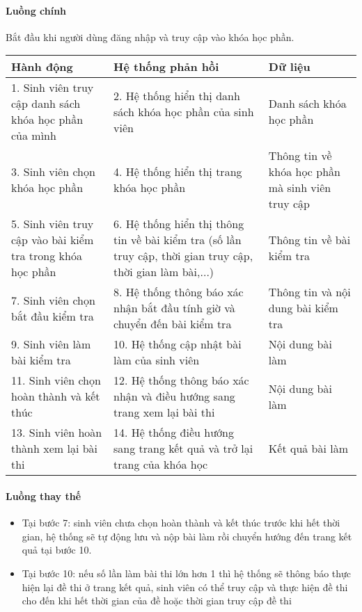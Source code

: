 \documentclass[./../main_file.tex]{subfiles}
\begin{document}
\paragraph{Luồng chính}
Bắt đầu khi người dùng đăng nhập và truy cập vào khóa học phần.
\begin{table}[H]
				\begin{tabular}{|p{.33\textwidth}|p{}|p{}|}
		\hline
		\textbf{Hành động} &
		\textbf{Hệ thống phản hồi} &
		\textbf{Dữ liệu} \\ \hline
		1. Sinh viên truy cập danh sách khóa học phần của mình &
		2. Hệ thống hiển thị danh sách khóa học phần của sinh viên &
		Danh sách khóa học phần \\ \hline
		3. Sinh viên chọn khóa học phần &
		4.  Hệ thống hiển thị trang khóa học phần &
		Thông tin về khóa học phần mà sinh viên truy cập \\ \hline
		5. Sinh viên truy cập vào bài kiểm tra trong khóa học phần &
		6. Hệ thống hiển thị thông tin về bài kiểm tra (số lần truy cập, thời gian truy cập, thời gian làm bài,...) &
		Thông tin về bài kiểm tra \\ \hline
		7. Sinh viên chọn bắt đầu kiểm tra &
		8. Hệ thống thông báo xác nhận bắt đầu tính giờ và chuyển đến bài kiểm tra &
		Thông tin và nội dung bài kiểm tra \\ \hline
		9. Sinh viên làm bài kiểm tra &
		10. Hệ thống cập nhật bài làm của sinh viên &
		Nội dung bài làm \\ \hline
		11. Sinh viên chọn hoàn thành và kết thúc &
		12. Hệ thống thông báo xác nhận và điều hướng sang trang xem lại bài thi &
		Nội dung bài làm \\ \hline
		13. Sinh viên hoàn thành xem lại bài thi &
		14. Hệ thống điều hướng sang trang kết quả và trở lại trang của khóa học &
		Kết quả bài làm \\ \hline
	\end{tabular}
\end{table}

\paragraph{Luồng thay thế}
\begin{itemize}
	\item Tại bước 7: sinh viên chưa chọn hoàn thành và kết thúc trước khi hết thời gian, hệ thống sẽ tự động lưu và nộp bài làm rồi chuyển hướng đến trang kết quả tại bước 10.
	\item Tại bước 10: nếu số lần làm bài thi lớn hơn 1 thì hệ thống sẽ thông báo thực hiện lại đề thi ở trang kết quả, sinh viên có thể truy cập và thực hiện đề thi cho đến khi hết thời gian của đề hoặc thời gian truy cập đề thi
	
\end{itemize}
\end{document}
